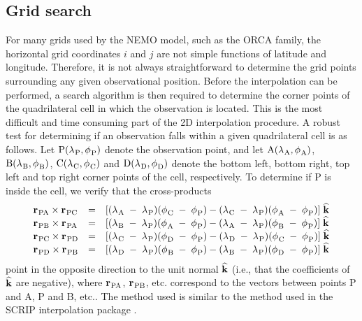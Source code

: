 \documentclass[../tex_main/NEMO_manual]{subfiles}
\begin{document}
\subsection{Grid search}

For many grids used by the NEMO model, such as the ORCA family, 
the horizontal grid coordinates $i$ and $j$ are not simple functions 
of latitude and longitude. Therefore, it is not always straightforward 
to determine the grid points surrounding any given observational position.
Before the interpolation can be performed, a search 
algorithm is then required to determine the corner points of 
the quadrilateral cell in which the observation is located.
This is the most difficult and time consuming part of the 
2D interpolation procedure. 
A robust test for determining if an observation falls
within a given quadrilateral cell is as follows. Let 
${\rm P}({\lambda_{}}_{\rm P} ,{\phi_{}}_{\rm P} )$ denote the observation point,
and let ${\rm A}({\lambda_{}}_{\rm A} ,{\phi_{}}_{\rm A} )$,
${\rm B}({\lambda_{}}_{\rm B} ,{\phi_{}}_{\rm B} )$,
${\rm C}({\lambda_{}}_{\rm C} ,{\phi_{}}_{\rm C} )$ 
and 
${\rm D}({\lambda_{}}_{\rm D} ,{\phi_{}}_{\rm D} )$ denote
the bottom left, bottom right, top left and top right
corner points of the cell, respectively. 
To determine if P is inside 
the cell, we verify that the cross-products 
\begin{eqnarray}
\begin{array}{lllll}
{{\bf r}_{}}_{\rm PA} \times {{\bf r}_{}}_{\rm PC}
& = & [({\lambda_{}}_{\rm A}\; -\; {\lambda_{}}_{\rm P} )
      ({\phi_{}}_{\rm C}   \; -\; {\phi_{}}_{\rm P} )
    - ({\lambda_{}}_{\rm C}\; -\; {\lambda_{}}_{\rm P} )
      ({\phi_{}}_{\rm A}   \; -\; {\phi_{}}_{\rm P} )] \; \widehat{\bf k} \\
{{\bf r}_{}}_{\rm PB} \times {{\bf r}_{}}_{\rm PA}
& = & [({\lambda_{}}_{\rm B}\; -\; {\lambda_{}}_{\rm P} )
      ({\phi_{}}_{\rm A}   \; -\; {\phi_{}}_{\rm P} )
    - ({\lambda_{}}_{\rm A}\; -\; {\lambda_{}}_{\rm P} )
      ({\phi_{}}_{\rm B}   \; -\; {\phi_{}}_{\rm P} )] \; \widehat{\bf k} \\
{{\bf r}_{}}_{\rm PC} \times {{\bf r}_{}}_{\rm PD}
& = & [({\lambda_{}}_{\rm C}\; -\; {\lambda_{}}_{\rm P} )
      ({\phi_{}}_{\rm D}   \; -\; {\phi_{}}_{\rm P} )
    - ({\lambda_{}}_{\rm D}\; -\; {\lambda_{}}_{\rm P} )
      ({\phi_{}}_{\rm C}   \; -\; {\phi_{}}_{\rm P} )] \; \widehat{\bf k} \\
{{\bf r}_{}}_{\rm PD} \times {{\bf r}_{}}_{\rm PB}
& = & [({\lambda_{}}_{\rm D}\; -\; {\lambda_{}}_{\rm P} )
      ({\phi_{}}_{\rm B}   \; -\; {\phi_{}}_{\rm P} )
    - ({\lambda_{}}_{\rm B}\; -\; {\lambda_{}}_{\rm P} )
      ({\phi_{}}_{\rm D}  \;  - \; {\phi_{}}_{\rm P} )] \; \widehat{\bf k} \\
\end{array}
\label{eq:cross}
\end{eqnarray}
point in the opposite direction to the unit normal 
$\widehat{\bf k}$ (i.e., that the coefficients of 
$\widehat{\bf k}$ are negative),
where ${{\bf r}_{}}_{\rm PA}$, ${{\bf r}_{}}_{\rm PB}$, 
etc. correspond to the vectors between points P and A, 
P and B, etc.. The method used is
similar to the method used in
the SCRIP interpolation package \citep{Jones_1998}.
\end{document}
